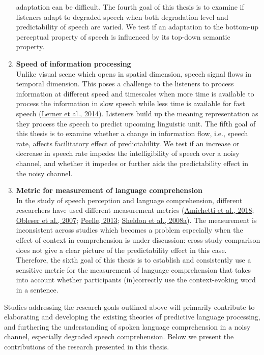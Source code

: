 \documentclass[a4paper, nobind]{templates/ociamthesis}
\begin{document}
\begin{enumerate}
  adaptation can be difficult.
  The fourth goal of this thesis is to examine if listeners adapt to degraded speech when both degradation level and predictability of speech are varied.
  We test if an adaptation to the bottom-up perceptual property of speech is influenced by its top-down semantic property.
\item
  \textbf{Speed of information processing}\\
  Unlike visual scene which opens in spatial dimension, speech signal flows in temporal dimension.
  This poses a challenge to the listeners to process information at different speed and timescales when
  more time is available to process the information in slow speech while less time is available for fast speech (\protect\hyperlink{ref-Lerner2014}{Lerner et al., 2014}).
  Listeners build up the meaning representation as they process the speech to predict upcoming linguistic unit.
  The fifth goal of this thesis is to examine whether a change in information flow, i.e., speech rate, affects facilitatory effect of predictability.
  We test if an increase or decrease in speech rate impedes the intelligibility of speech over a noisy channel,
  and whether it impedes or further aids the predictability effect in the noisy channel.
\item
  \textbf{Metric for measurement of language comprehension}\\
  In the study of speech perception and language comprehension, different researchers have used different measurement metrics (\protect\hyperlink{ref-Amichetti2018}{Amichetti et al., 2018}; \protect\hyperlink{ref-Obleser2007}{Obleser et al., 2007}; \protect\hyperlink{ref-Peelle2013}{Peelle, 2013}; \protect\hyperlink{ref-Sheldon2008a}{Sheldon et al., 2008a}).
  The measurement is inconsistent across studies which becomes a problem especially when the effect of context in comprehension is under discussion:
  cross-study comparison does not give a clear picture of the predictability effect in this case.
  Therefore, the sixth goal of this thesis is to establish and consistently use a sensitive metric for the measurement of language comprehension that takes into account whether participants (in)correctly use the context-evoking word in a sentence.
\end{enumerate}

Studies addressing the research goals outlined above will primarily contribute to elaborating and developing the existing theories of predictive language processing, and furthering the understanding of spoken language comprehension in a noisy channel, especially degraded speech comprehension.
Below we present the contributions of the research presented in this thesis.
\end{document}
